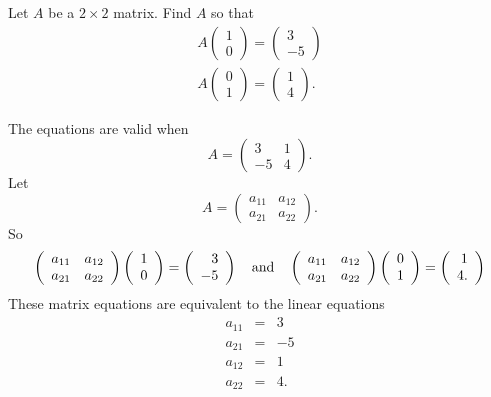 \documentclass{ximera}
\begin{document}
\begin{exercise} \label{c4.1.7}
Let $A$ be a $2\times 2$ matrix.  Find $A$ so that
\begin{eqnarray*}
A\left(\begin{array}{c} 1 \\ 0 \end{array}\right) =
\left(\begin{array}{r} 3 \\ -5 \end{array}\right) \\
A\left(\begin{array}{c} 0 \\ 1 \end{array}\right) =
\left(\begin{array}{r} 1 \\ 4 \end{array}\right).
\end{eqnarray*}

\begin{solution}

\ans The equations are valid when
\[ A = \left(\begin{array}{rr} 3 & 1 \\ -5 & 4\end{array}\right). \]
\soln Let
\[ A = \left(\begin{array}{rr} a_{11} & a_{12} \\ a_{21} & 
a_{22}\end{array}\right). \]
So
\[ \left(\begin{array}{rr} a_{11} & a_{12} \\ a_{21} & a_{22}\end{array}\right)
\left(\begin{array}{r} 1 \\ 0\end{array}\right) =
\left(\begin{array}{r} 3 \\ -5\end{array}\right) \quad\mbox{and}\quad
\left(\begin{array}{rr} a_{11} & a_{12} \\ a_{21} & a_{22}\end{array}\right)
\left(\begin{array}{r} 0 \\ 1\end{array}\right) =
\left(\begin{array}{r} 1 \\ 4.\end{array}\right) \]
These matrix equations are equivalent to the linear equations
\[ \begin{array}{rcl}
a_{11} & = & 3 \\
a_{21} & = & -5 \\
a_{12} & = & 1 \\
a_{22} & = & 4.\end{array} \]


\end{solution}
\end{exercise}
\end{document}
